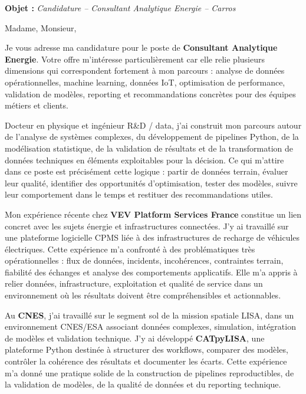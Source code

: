 \documentclass[11pt,a4paper]{altacv}
\begin{document}
\makecvheader
\vspace{-0.65cm}

\vspace{-0.45cm}

{\color{accent}\textbf{Objet :}} \textit{Candidature -- Consultant Analytique Energie -- Carros}

{\color{body}

Madame, Monsieur,

Je vous adresse ma candidature pour le poste de \textbf{Consultant Analytique Energie}. Votre offre m'intéresse particulièrement car elle relie plusieurs dimensions qui correspondent fortement à mon parcours : analyse de données opérationnelles, machine learning, données IoT, optimisation de performance, validation de modèles, reporting et recommandations concrètes pour des équipes métiers et clients.

Docteur en physique et ingénieur R\&D / data, j'ai construit mon parcours autour de l'analyse de systèmes complexes, du développement de pipelines Python, de la modélisation statistique, de la validation de résultats et de la transformation de données techniques en éléments exploitables pour la décision. Ce qui m'attire dans ce poste est précisément cette logique : partir de données terrain, évaluer leur qualité, identifier des opportunités d'optimisation, tester des modèles, suivre leur comportement dans le temps et restituer des recommandations utiles.

Mon expérience récente chez \textbf{VEV Platform Services France} constitue un lien concret avec les sujets énergie et infrastructures connectées. J'y ai travaillé sur une plateforme logicielle CPMS liée à des infrastructures de recharge de véhicules électriques. Cette expérience m'a confronté à des problématiques très opérationnelles : flux de données, incidents, incohérences, contraintes terrain, fiabilité des échanges et analyse des comportements applicatifs. Elle m'a appris à relier données, infrastructure, exploitation et qualité de service dans un environnement où les résultats doivent être compréhensibles et actionnables.

Au \textbf{CNES}, j'ai travaillé sur le segment sol de la mission spatiale LISA, dans un environnement CNES/ESA associant données complexes, simulation, intégration de modèles et validation technique. J'y ai développé \textbf{CATpyLISA}, une plateforme Python destinée à structurer des workflows, comparer des modèles, contrôler la cohérence des résultats et documenter les écarts. Cette expérience m'a donné une pratique solide de la construction de pipelines reproductibles, de la validation de modèles, de la qualité de données et du reporting technique.

}
\end{document}
